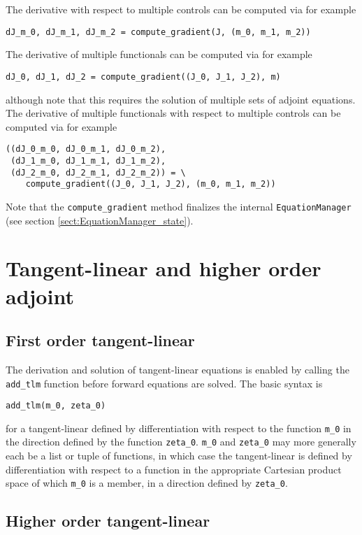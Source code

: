 \documentclass[11pt]{article}
\begin{document}
The derivative with respect to multiple controls can be computed via for
example
\begin{lstlisting}
dJ_m_0, dJ_m_1, dJ_m_2 = compute_gradient(J, (m_0, m_1, m_2))
\end{lstlisting}
The derivative of multiple functionals can be computed via for example
\begin{lstlisting}
dJ_0, dJ_1, dJ_2 = compute_gradient((J_0, J_1, J_2), m)
\end{lstlisting}
although note that this requires the solution of multiple sets of adjoint
equations. The derivative of multiple functionals with respect to multiple
controls can be computed via for example
\begin{lstlisting}
((dJ_0_m_0, dJ_0_m_1, dJ_0_m_2),
 (dJ_1_m_0, dJ_1_m_1, dJ_1_m_2),
 (dJ_2_m_0, dJ_2_m_1, dJ_2_m_2)) = \
    compute_gradient((J_0, J_1, J_2), (m_0, m_1, m_2))
\end{lstlisting}

Note that the \texttt{compute\_gradient} method finalizes the internal
\texttt{EquationManager} (see section \ref{sect:EquationManager_state}).

\section{Tangent-linear and higher order adjoint}\label{sect:higher_order}

\subsection{First order tangent-linear}

The derivation and solution of tangent-linear equations is enabled by calling
the \texttt{add\_tlm} function before forward equations are solved. The basic
syntax is
\begin{lstlisting}
add_tlm(m_0, zeta_0)
\end{lstlisting}
for a tangent-linear defined by differentiation with respect to the function
\texttt{m\_0} in the direction defined by the function \texttt{zeta\_0}.
\texttt{m\_0} and \texttt{zeta\_0} may more generally each be a list or tuple
of functions, in which case the tangent-linear is defined by differentiation
with respect to a function in the appropriate Cartesian product space of which
\texttt{m\_0} is a member, in a direction defined by \texttt{zeta\_0}.

\subsection{Higher order tangent-linear}
\end{document}

